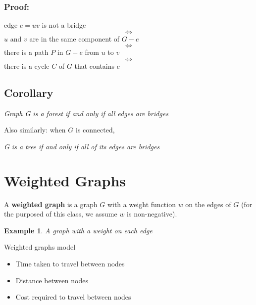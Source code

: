 \documentclass{report}
\newtheorem{ex}{Example}[section]
\begin{document}
\subsubsection{Proof:}
\begin{center}
edge $e = uv$ is not a bridge
$$\iff$$
$u$ and $v$ are in the same component of $G-e$
$$\iff$$
there is a path $P$ in $G-e$ from $u$ to $v$
$$\iff$$
there is a cycle $C$ of $G$ that contains $e$
\end{center}
\subsection{Corollary}
\begin{center}
\textit{Graph G is a forest if and only if all edges are bridges}
\end{center}
Also similarly: when $G$ is connected,
\begin{center}
\textit{G is a tree if and only if all of its edges are bridges}
\end{center}
\section{Weighted Graphs}
A \textbf{weighted graph} is a graph $G$ with a weight function $w$ on the edges of $G$ (for the purposed of this class, we assume $w$ is non-negative).
\begin{ex}
A graph with a weight on each edge
\end{ex}
\begin{center}
\end{center}
\noindent Weighted graphs model
\begin{itemize}
\item Time taken to travel between nodes
\item Distance between nodes
\item Cost required to travel between nodes
\end{itemize}
\end{document}
